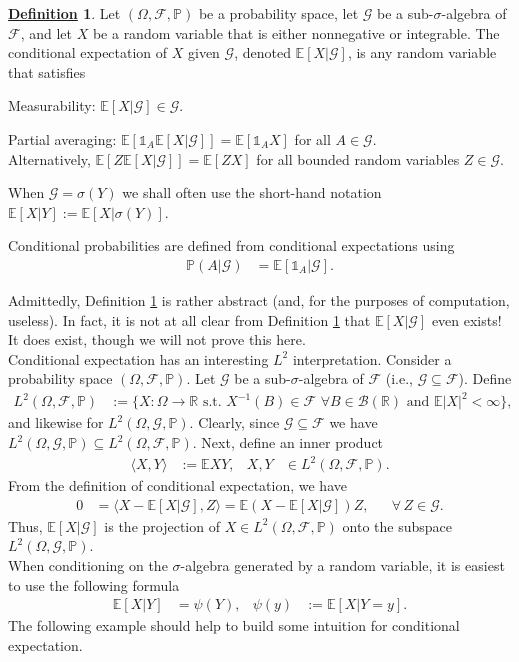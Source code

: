 \documentclass[12pt]{book}
\numberwithin{equation}{chapter}
\theoremstyle{plain}
\numberwithin{theorem}{section}
\theoremstyle{definition}
\newtheorem{definition}[theorem]{\underline{Definition}}
\numberwithin{exercise}{chapter}
\newcommand{\<}{\langle}
\renewcommand{\>}{\rangle}
\renewcommand{\(}{\left(}
\renewcommand{\)}{\right)}
\renewcommand{\[}{\left[}
\renewcommand{\]}{\right]}
\newcommand\Eb{\mathds{E}}
\newcommand\Ib{\mathds{1}} 	%
\newcommand\Pb{\mathds{P}}
\newcommand\Rb{\mathds{R}}
\newcommand\Bc{\mathscr{B}}
\newcommand\Fc{\mathscr{F}}
\newcommand\Gc{\mathscr{G}}
\newcommand\Om{\Omega}
\newcommand\sig{\sigma}
\begin{document}
\begin{definition}
\label{def:cond.E}
Let $(\Om,\Fc,\Pb)$  be a probability space, let  $\Gc$ be a sub-$\sig$-algebra of $\Fc$, and let $X$ be a random variable that is either nonnegative or integrable.
The  conditional expectation of $X$ given $\Gc$, denoted $\Eb[X|\Gc]$, is any random
variable that satisfies
\begin{enumerate*}
\item Measurability: $\Eb[X|\Gc] \in \Gc$.
\item Partial averaging: $\Eb[ \Ib_A \Eb[X|\Gc] ] = \Eb[ \Ib_A X ]$ for all $A \in \Gc$.  \\
Alternatively, $\Eb[ Z \Eb[X|\Gc] ] = \Eb[ Z X ]$ for all bounded random variables $Z \in \Gc$.
\end{enumerate*}
When $\Gc = \sig(Y)$ we shall often use the short-hand notation $\Eb[X|Y]:=\Eb[X|\sig(Y)]$.
\end{definition}

\noindent
Conditional probabilities are defined from conditional expectations using
\begin{align}
\Pb( A | \Gc )
	&=	\Eb[ \Ib_A | \Gc ] .
\end{align}

\noindent
Admittedly, Definition \ref{def:cond.E} is rather abstract (and, for the purposes of computation, useless).  
In fact, it is not at all clear from Definition \ref{def:cond.E} that $\Eb[X|\Gc]$ even exists!  It does exist, though we will not prove this here.
\\[0.5em]
Conditional expectation has an interesting $L^2$ interpretation.  Consider a probability space $(\Om,\Fc,\Pb)$. Let $\Gc$ be a sub-$\sig$-algebra of $\Fc$ (i.e., $\Gc \subseteq \Fc$).  Define
\begin{align}
L^2(\Om,\Fc,\Pb)
	&:=	\{ X : \Om \to \Rb \text{ s.t. } X^{-1}(B) \in \Fc \,\, \forall B \in \Bc(\Rb) \text{ and } \Eb |X|^2 < \infty \} ,
\end{align}
and likewise for $L^2(\Om,\Gc,\Pb)$.  Clearly, since $\Gc \subseteq \Fc$ we have $L^2(\Om,\Gc,\Pb) \subseteq L^2(\Om,\Fc,\Pb)$.  Next, define an inner product
\begin{align}
\< X, Y \>
	&:=	\Eb X Y , &
X,Y
	&\in L^2(\Om,\Fc,\Pb).
\end{align}
From the definition of conditional expectation, we have
\begin{align}
0
	&=	\< X - \Eb[X|\Gc], Z \> 
	=		\Eb(X - \Eb[X|\Gc]) Z , &
	&\forall \, Z \in \Gc .
\end{align}
Thus, $\Eb[X|\Gc]$ is the projection of $X \in L^2(\Om,\Fc,\Pb)$ onto the subspace $L^2(\Om,\Gc,\Pb)$.
\\[0.5em]
When conditioning on the $\sig$-algebra generated by a random variable, it is easiest to use the following formula
\begin{align}
\Eb[ X | Y ]
	&=	\psi(Y) , &
\psi(y)
	&:=	\Eb[ X | Y = y ] . \label{eq:cond.E}
\end{align}
The following example should help to build some intuition for conditional expectation.
\end{document}

